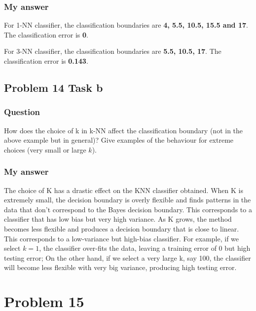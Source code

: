 \documentclass[
]{article}
\begin{document}
\hypertarget{my-answer-11}{%
\subsubsection{My answer}\label{my-answer-11}}

For 1-NN classifier, the classification boundaries are \textbf{4, 5.5,
10.5, 15.5 and 17}. The classification error is \textbf{0}.

For 3-NN classifier, the classification boundaries are \textbf{5.5,
10.5, 17}. The classification error is \textbf{0.143}.

\hypertarget{problem-14-task-b}{%
\subsection{Problem 14 Task b}\label{problem-14-task-b}}

\hypertarget{question-12}{%
\subsubsection{Question}\label{question-12}}

How does the choice of k in k-NN affect the classification boundary (not
in the above example but in general)? Give examples of the behaviour for
extreme choices (very small or large \(k\)).

\hypertarget{my-answer-12}{%
\subsubsection{My answer}\label{my-answer-12}}

The choice of K has a drastic effect on the KNN classifier obtained.
When K is extremely small, the decision boundary is overly flexible and
finds patterns in the data that don't correspond to the Bayes decision
boundary. This corresponds to a classifier that has low bias but very
high variance. As K grows, the method becomes less flexible and produces
a decision boundary that is close to linear. This corresponds to a
low-variance but high-bias classifier. For example, if we select
\(k = 1\), the classifier over-fits the data, leaving a training error
of 0 but high testing error; On the other hand, if we select a very
large k, say 100, the classifier will become less flexible with very big
variance, producing high testing error.

\hypertarget{problem-15}{%
\section{Problem 15}\label{problem-15}}
\end{document}
